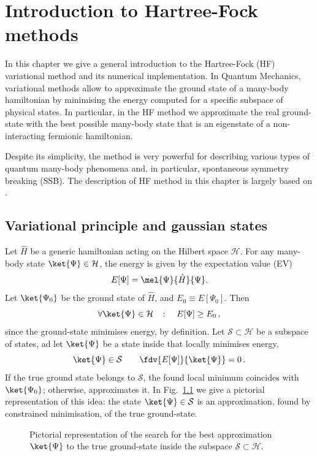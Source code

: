  \def\GraphicsFolder{chapters/hf-introduction/pictures}

\chapter{Introduction to Hartree-Fock methods}\label{chap:hf}

In this chapter we give a general introduction to the Hartree-Fock (HF) variational method and its numerical implementation. In Quantum Mechanics, variational methods allow to approximate the ground state of a many-body hamiltonian by minimising the energy computed for a specific subspace of physical states. In particular, in the HF method we approximate the real ground-state with the best possible many-body state that is an eigenstate of a non-interacting fermionic hamiltonian.

Despite its simplicity, the method is very powerful for describing various types of quantum many-body phenomena and, in particular, spontaneous symmetry breaking (SSB). The description of HF method in this chapter is largely based on \cite{grosso2014solid, fabrizio2022course}.

\section{Variational principle and gaussian states}

Let $\hat H$ be a generic hamiltonian acting on the Hilbert space $\mathcal{H}$. For any many-body state $\ket{\Psi} \in \mathcal{H}$, the energy is given by the expectation value (EV)
\[
	E[\Psi] = \mel{\Psi}{\hat H}{\Psi}.
\]
Let $\ket{\Psi_0}$ be the ground state of $\hat H$, and $E_0 \equiv E[\Psi_0]$. Then
\[
	\forall \ket{\Psi} \in \mathcal{H}
	\quad\colon\quad
	E[\Psi] \ge E_0 \, ,
\]
since the ground-state minimises energy, by definition. Let $\mathcal{S} \subset \mathcal{H}$ be a subspace of states, ad let $\ket{\Psi}$ be a state inside that locally minimises energy,
\[
	\ket{\Psi} \in \mathcal{S}
	\qquad
	\fdv{E[\Psi]}{\ket{\Psi}} = 0 \, .
\]
If the true ground state belongs to $\mathcal{S}$, the found local minimum coincides with $\ket{\Psi_0}$; otherwise, approximates it. In Fig.~\ref{fig:gaussian-subspace} we give a pictorial representation of this idea: the state $\ket{\Psi}\in\mathcal{S}$ is an approximation, found by constrained minimisation, of the true ground-state.

\begin{figure}
	\centering
	
	\caption{Pictorial representation of the search for the best approximation $\ket{\Psi}$ to the true ground-state inside the subspace $\mathcal{S}\subset\mathcal{H}$.}
	\label{fig:gaussian-subspace}
\end{figure}

